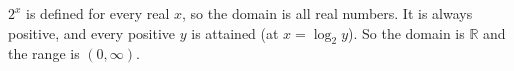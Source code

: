 $2^x$ is defined for every real $x$, so the domain is all real numbers. It is always positive, and every positive $y$ is attained (at $x=\log_2y$). So the domain is $\boxed{\mathbb R}$ and the range is $\boxed{(0,\infty)}$.
